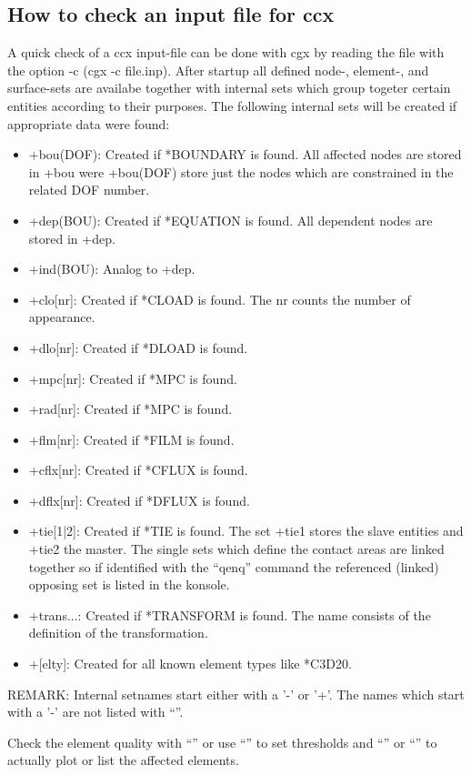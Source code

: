 \documentclass{article}
\begin{document}
\begin{appendix}
\subsection{\label{How to check an input file for ccx}How to check an input file for ccx}
A quick check of a ccx input-file can be done with cgx by reading the file with the option -c (cgx -c file.inp). After startup all defined node-, element-, and surface-sets are availabe together with internal sets which group togeter certain entities according to their purposes. The following internal sets will be created if appropriate data were found: 
\begin{itemize}
\item +bou(DOF):  Created if *BOUNDARY is found. All affected nodes are stored in +bou were +bou(DOF) store just the nodes which are constrained in the related DOF number.
\item +dep(BOU):  Created if *EQUATION is found. All dependent nodes are stored in +dep.
\item +ind(BOU):  Analog to +dep.
\item +clo[nr]:   Created if *CLOAD is found. The nr counts the number of appearance.
\item +dlo[nr]:   Created if *DLOAD is found.
\item +mpc[nr]:   Created if *MPC is found.
\item +rad[nr]:   Created if *MPC is found.
\item +flm[nr]:   Created if *FILM is found.
\item +cflx[nr]:  Created if *CFLUX is found.
\item +dflx[nr]:  Created if *DFLUX is found.
\item +tie[1|2]:  Created if *TIE is found. The set +tie1 stores the slave entities and +tie2 the master. The single sets which define the contact areas are linked together so if identified with the ``qenq'' command the referenced (linked) opposing set is listed in the konsole.
\item +trans...:  Created if *TRANSFORM is found. The name consists of the definition of the transformation.
\item +[elty]:    Created for all known element types like *C3D20.
\end{itemize}
REMARK: Internal setnames start either with a '-' or '+'. The names which start with a '-' are not listed with ``''. 

Check the element quality with ``'' or use ``'' to set thresholds and
``'' or ``'' to actually plot or list the affected elements.


\end{appendix}
\end{document}
